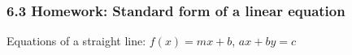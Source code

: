 

\fancyhead[LE]{\thepage}



\subsubsection*{6.3 Homework: Standard form of a linear equation}
Equations of a straight line: $f(x)=mx+b$, $ax+by=c$ \par
